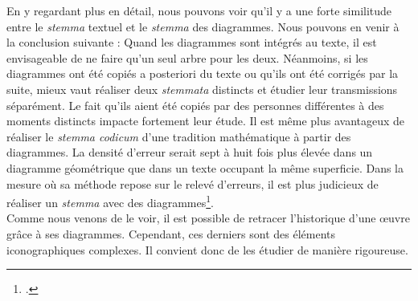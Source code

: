 En y regardant plus en détail, nous pouvons voir qu'il y a une forte similitude entre le \textit{stemma} textuel et le \textit{stemma} des diagrammes. Nous pouvons en venir à la conclusion suivante : Quand les diagrammes sont intégrés au texte, il est envisageable de ne faire qu'un seul arbre pour les deux. Néanmoins, si les diagrammes ont été copiés a posteriori du texte ou qu'ils ont été corrigés par la suite, mieux vaut réaliser deux \textit{stemmata} distincts et étudier leur transmissions séparément. Le fait qu'ils aient été copiés par des personnes différentes à des moments distincts impacte fortement leur étude. Il est même plus avantageux de réaliser le \textit{stemma codicum} d'une tradition mathématique à partir des diagrammes. La densité d'erreur serait sept à huit fois plus élevée dans un diagramme géométrique que dans un texte occupant la même superficie. Dans la mesure où sa méthode repose sur le relevé d'erreurs, il est plus judicieux de réaliser un \textit{stemma} avec des diagrammes\footcite{raynaudBuildingStemmaCodicum2014}.\\

Comme nous venons de le voir, il est possible de retracer l'historique d'une œuvre grâce à ses diagrammes. Cependant, ces derniers sont des éléments iconographiques complexes. Il convient donc de les étudier de manière rigoureuse.
